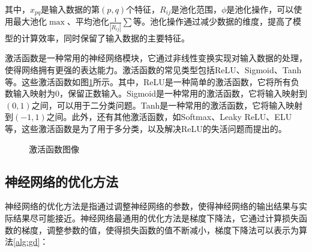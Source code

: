 其中，$x_{pq}$是输入数据的第$(p,q)$个特征，$R_{ij}$是池化范围，$\phi$是池化操作，可以使用最大池化$\max$、平均池化$\frac{1}{|R_{ij}|}\sum$等。池化操作通过减少数据的维度，提高了模型的计算效率，同时保留了输入数据的主要特征。

激活函数是一种常用的神经网络模块，它通过非线性变换实现对输入数据的处理，使得网络拥有更强的表达能力。激活函数的常见类型包括ReLU、Sigmoid、Tanh等。这些激活函数如图\ref{fig:activation}所示。其中，ReLU是一种简单的激活函数，它将所有负数输入映射为0，保留正数输入。Sigmoid是一种常用的激活函数，它将输入映射到$(0,1)$之间，可以用于二分类问题。Tanh是一种常用的激活函数，它将输入映射到$(-1,1)$之间。此外，还有其他激活函数，如Softmax、Leaky ReLU、ELU等，这些激活函数是为了用于多分类，以及解决ReLU的失活问题而提出的。

\begin{figure}[H]
    \centering
    \caption{激活函数图像}
    \label{fig:activation}
\end{figure}

\subsection{神经网络的优化方法}

神经网络的优化方法是指通过调整神经网络的参数，使得神经网络的输出结果与实际结果尽可能接近。神经网络最通用的优化方法是梯度下降法，它通过计算损失函数的梯度，调整参数的值，使得损失函数的值不断减小，梯度下降法可以表示为算法\ref{alg:gd}：


